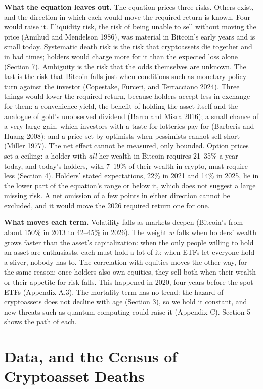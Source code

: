 \documentclass[11pt]{article}
\begin{document}
\textbf{What the equation leaves out.} The equation prices three risks. Others exist, and the direction in which each would move the required return is known. Four would raise it. Illiquidity risk, the risk of being unable to sell without moving the price (Amihud and Mendelson 1986), was material in Bitcoin's early years and is small today. Systematic death risk is the risk that cryptoassets die together and in bad times; holders would charge more for it than the expected loss alone (Section 7). Ambiguity is the risk that the odds themselves are unknown. The last is the risk that Bitcoin falls just when conditions such as monetary policy turn against the investor (Copestake, Furceri, and Terracciano 2024). Three things would lower the required return, because holders accept less in exchange for them: a convenience yield, the benefit of holding the asset itself and the analogue of gold's unobserved dividend (Barro and Misra 2016); a small chance of a very large gain, which investors with a taste for lotteries pay for (Barberis and Huang 2008); and a price set by optimists when pessimists cannot sell short (Miller 1977). The net effect cannot be measured, only bounded. Option prices set a ceiling: a holder with \emph{all} her wealth in Bitcoin requires 21--35\% a year today, and today's holders, with 7--19\% of their wealth in crypto, must require less (Section 4). Holders' stated expectations, 22\% in 2021 and 14\% in 2025, lie in the lower part of the equation's range or below it, which does not suggest a large missing risk. A net omission of a few points in either direction cannot be excluded, and it would move the 2026 required return one for one.

\textbf{What moves each term.} Volatility falls as markets deepen (Bitcoin's from about 150\% in 2013 to 42--45\% in 2026). The weight $w$ falls when holders' wealth grows faster than the asset's capitalization: when the only people willing to hold an asset are enthusiasts, each must hold a lot of it; when ETFs let everyone hold a sliver, nobody has to. The correlation with equities moves the other way, for the same reason: once holders also own equities, they sell both when their wealth or their appetite for risk falls. This happened in 2020, four years before the spot ETFs (Appendix A.3). The mortality term has no trend: the hazard of cryptoassets does not decline with age (Section 3), so we hold it constant, and new threats such as quantum computing could raise it (Appendix C). Section 5 shows the path of each.

\section{Data, and the Census of Cryptoasset Deaths}
\end{document}
